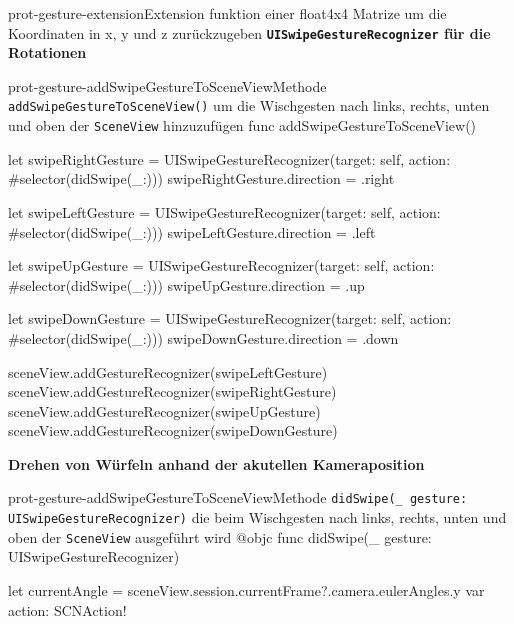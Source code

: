 \begin{description}
\begin{code}{prot-gesture-extension}{Extension funktion einer float4x4 Matrize um die Koordinaten in x, y und z zurückzugeben}
    \textbf{\texttt{UISwipeGestureRecognizer} für die Rotationen}\\
    
    \begin{code}{prot-gesture-addSwipeGestureToSceneView}{Methode \texttt{addSwipeGestureToSceneView()} um die Wischgesten nach links, rechts, unten und oben der \texttt{SceneView} hinzuzufügen}
    func addSwipeGestureToSceneView() {
        let swipeRightGesture = UISwipeGestureRecognizer(target: self, action: #selector(didSwipe(_:)))
        swipeRightGesture.direction = .right
        
        let swipeLeftGesture = UISwipeGestureRecognizer(target: self, action: #selector(didSwipe(_:)))
        swipeLeftGesture.direction = .left
        
        let swipeUpGesture = UISwipeGestureRecognizer(target: self, action: #selector(didSwipe(_:)))
        swipeUpGesture.direction = .up
        
        let swipeDownGesture = UISwipeGestureRecognizer(target: self, action: #selector(didSwipe(_:)))
        swipeDownGesture.direction = .down
        
        sceneView.addGestureRecognizer(swipeLeftGesture)
        sceneView.addGestureRecognizer(swipeRightGesture)
        sceneView.addGestureRecognizer(swipeUpGesture)
        sceneView.addGestureRecognizer(swipeDownGesture)
    }
    \end{code}


    \textbf{Drehen von Würfeln anhand der akutellen Kameraposition}\\

    \begin{code}{prot-gesture-addSwipeGestureToSceneView}{Methode \texttt{didSwipe(\_ gesture: UISwipeGestureRecognizer)} die beim Wischgesten nach links, rechts, unten und oben der \texttt{SceneView} ausgeführt wird}
        @objc
        func didSwipe(_ gesture: UISwipeGestureRecognizer) {
            let currentAngle = sceneView.session.currentFrame?.camera.eulerAngles.y
            var action: SCNAction!
            
}
\end{code}
\end{code}
\end{description}

